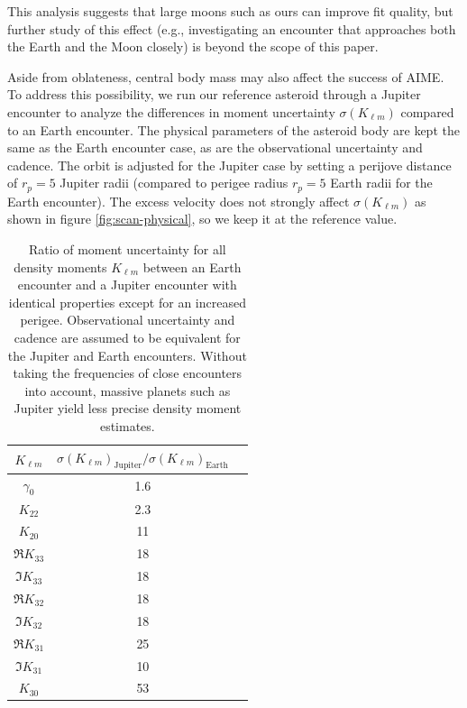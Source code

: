 \documentclass[fleqn,usenatbib]{mnras}
\begin{document}
This analysis suggests that large moons such as ours can improve fit quality, but further study of this effect (e.g., investigating an encounter that approaches both the Earth and the Moon closely) is beyond the scope of this paper.

Aside from oblateness, central body mass may also affect the success of AIME. To address this possibility, we run our reference asteroid through a Jupiter encounter to analyze the differences in moment uncertainty $\sigma(K_{\ell m})$ compared to an Earth encounter. The physical parameters of the asteroid body are kept the same as the Earth encounter case, as are the observational uncertainty and cadence. The orbit is adjusted for the Jupiter case by setting a perijove distance of $r_p=5$ Jupiter radii (compared to perigee radius $r_p=5$ Earth radii for the Earth encounter). The excess velocity does not strongly affect $\sigma(K_{\ell m})$ as shown in figure \ref{fig:scan-physical}, so we keep it at the reference value.
\begin{table}
  \centering
  \begin{tabular}{c|cc}
    \hline 
    $K_{\ell m}$ & $\sigma(K_{\ell m})_\text{Jupiter}/\sigma(K_{\ell m})_\text{Earth}$\\ \hline 
    $\gamma_0$ & 1.6 \\
    $K_{22}$ & 2.3 \\
    $K_{20}$ & 11 \\
    $\Re K_{33}$ & 18 \\
    $\Im K_{33}$ & 18 \\
    $\Re K_{32}$ & 18 \\
    $\Im K_{32}$ & 18 \\
    $\Re K_{31}$ & 25 \\
    $\Im K_{31}$ & 10 \\
    $K_{30}$ & 53 \\ \hline
  \end{tabular}
  \caption{Ratio of moment uncertainty for all density moments $K_{\ell m}$ between an Earth encounter and a Jupiter encounter with identical properties except for an increased perigee. Observational uncertainty and cadence are assumed to be equivalent for the Jupiter and Earth encounters. Without taking the frequencies of close encounters into account, massive planets such as Jupiter yield less precise density moment estimates.}
  \label{tab:jupiter-uncertainty}
\end{table}
\end{document}
